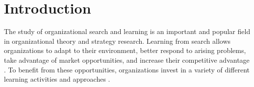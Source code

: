\pagebreak


\section*{Introduction}


The study of organizational search and learning is an important and popular field in organizational theory and strategy research. Learning from search allows organizations to adapt to their environment, better respond to arising problems, take advantage of market opportunities, and increase their competitive advantage \citep{Argote2012_Organizational-Learning-Curves:-An-Overview, ArgoteTodorova2007_Organizational-Learning_IntRevOfIndustrialAndOrganizationalPsychology, Haunschild1993_Interorganizational-Imitation-The-Impact-of-Interlocks_ASQ, MarchSimon1958_Organizations}. To benefit from these opportunities, organizations invest in a variety of different learning activities and approaches \citep{BinghamDavis2012_Learning-Sequences-Their-Existence-Effect-and-Evolution_AMJ}. %


